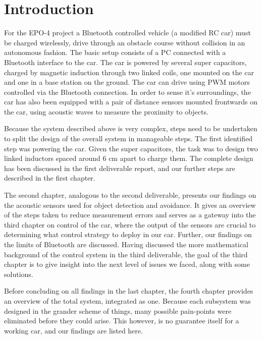 \documentclass[11pt,titlepage]{report}
\begin{document}
\chapter{Introduction}
For the EPO-4 project a Bluetooth controlled vehicle (a modified RC car) must be charged wirelessly, drive through an obstacle course without collision in an autonomous fashion. The basic setup consists of a PC connected with a Bluetooth interface to the car. The car is powered by several super capacitors, charged by magnetic induction through two linked coils, one mounted on the car and one in a base station on the ground. The car can drive using PWM motors controlled via the Bluetooth connection. In order to sense it's surroundings, the car has also been equipped with a pair of distance sensors mounted frontwards on the car, using acoustic waves to measure the proximity to objects.

Because the system described above is very complex, steps need to be undertaken to split the design of the overall system in manageable steps. The first identified step was powering the car. Given the super capacitors, the task was to design two linked inductors spaced around 6 cm apart to charge them. The complete design has been discussed in the first deliverable report, and our further steps are described in the first chapter.

The second chapter, analogous to the second deliverable, presents our findings on the acoustic sensors used for object detection and avoidance. It gives an overview of the steps taken to reduce measurement errors and serves as a gateway into the third chapter on control of the car, where the output of the sensors are crucial to determining what control strategy to deploy in our car. Further, our findings on the limits of Bluetooth are discussed. Having discussed the more mathematical background of the control system in the third deliverable, the goal of the third chapter is to give insight into the next level of issues we faced, along with some solutions.

Before concluding on all findings in the last chapter, the fourth chapter provides an overview of the total system, integrated as one. Because each subsystem was designed in the grander scheme of things, many possible pain-points were eliminated before they could arise. This however, is no guarantee itself for a working car, and our findings are listed here.
\end{document}
